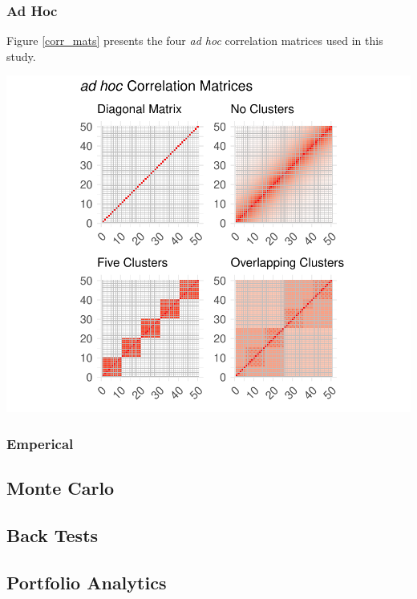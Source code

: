\documentclass[11pt,preprint, authoryear]{elsarticle}
\let\origfigure\figure
\let\endorigfigure\endfigure
\renewenvironment{figure}[1][2] {
    \expandafter\origfigure\expandafter[H]
} {
    \endorigfigure
}
\numberwithin{equation}{section}
\numberwithin{figure}{section}
\numberwithin{table}{section}
\begin{document}
\hypertarget{ad-hoc}{%
\subsubsection{\texorpdfstring{Ad Hoc
\label{adhoc}}{Ad Hoc }}\label{ad-hoc}}

Figure \ref{corr_mats} presents the four \emph{ad hoc} correlation
matrices used in this study.

\begin{figure}
\centering
\includegraphics{Thesis_files/figure-latex/corr mats-1.pdf}
\caption{\label{corr_mats} Correlation Matricies}
\end{figure}

\hypertarget{emperical}{%
\subsubsection{\texorpdfstring{Emperical
\label{emp}}{Emperical }}\label{emperical}}

\hypertarget{monte-carlo}{%
\subsection{Monte Carlo}\label{monte-carlo}}

\hypertarget{back-tests}{%
\subsection{Back Tests}\label{back-tests}}

\hypertarget{portfolio-analytics}{%
\subsection{Portfolio Analytics}\label{portfolio-analytics}}
\end{document}
